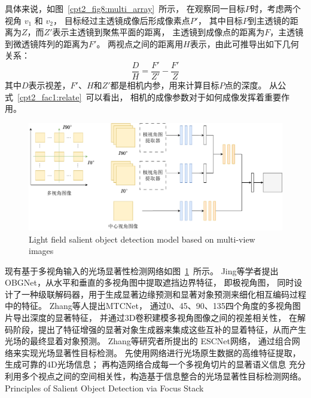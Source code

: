 具体来说，如图~\ref{cpt2_fig8:multi_array}~所示，
在观察同一目标$P$时，考虑两个视角 $v_{1}$ 和 $v_{2}$，
目标经过主透镜成像后形成像素点$P'$，
其中目标$P$到主透镜的距离为$Z$，而$Z'$表示主透镜到聚焦平面的距离，
主透镜到成像点的距离为$F$，主透镜到微透镜阵列的距离为$F'$。
两视点之间的距离用$H$表示，由此可推导出如下几何关系：
%
%
\begin{equation}
	\frac{D}{H} = \frac{F'}{Z'} - \frac{F'}{Z} 
	\label{cpt2_fac1:relate}
\end{equation}
%
%
其中$D$表示视差，$F'$、$H$和$Z'$都是相机内参，用来计算目标$P$点的深度。
从公式~\ref{cpt2_fac1:relate}~可以看出，
相机的成像参数对于如何成像发挥着重要作用。
\par
\begin{figure}[t]
	\centering
	\includegraphics[width=1\linewidth]{figures/chapter2/multi_images_fssod}
	{Light field salient object detection model based on multi-view images}  
	\label{chpt2:figure:model_of_multi_inputs}
\end{figure}
现有基于多视角输入的光场显著性检测网络如图~\ref{chpt2:figure:model_of_multi_inputs}~所示。
Jing等学者提出OBGNet，从水平和垂直的多视角图中提取遮挡边界特征，
即极视角图，
同时设计了一种级联解码器，用于生成显著边缘预测和显著对象预测来细化相互编码过程中的特征。
Zhang等人提出MTCNet，
通过0、45、90、135四个角度的多视角图片导出深度的显著特征，
并通过3D卷积建模多视角图像之间的视差相关性，
在解码阶段，提出了特征增强的显著对象生成器来集成这些互补的显着特征，从而产生光场的最终显着对象预测。
Zhang等研究者所提出的 ESCNet网络，
通过组合网络来实现光场显著性目标检测。
先使用网络进行光场原生数据的高维特征提取，生成可靠的4D光场信息；
再构造网络合成每一个多视角切片的显著语义信息
充分利用多个视点之间的空间相关性，构造基于信息整合的光场显著性目标检测网络。
{Principles of Salient Object Detection via Focus Stack}

